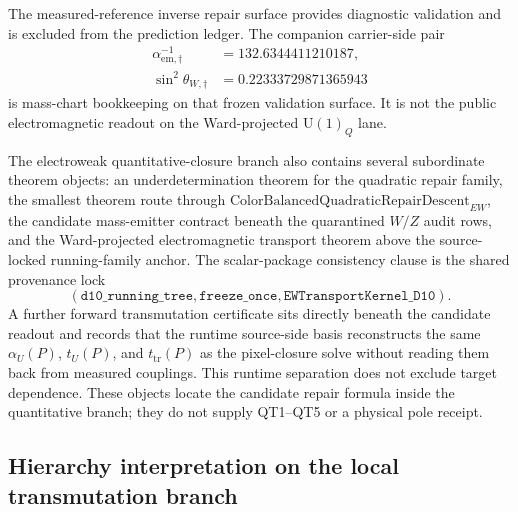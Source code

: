 \documentclass[11pt]{article}
\newcommand{\U}{\mathrm{U}}
\begin{document}
The measured-reference inverse repair surface provides diagnostic validation and is excluded from
the prediction ledger.
The companion carrier-side pair
\[
\begin{aligned}
\alpha_{\mathrm{em},\dagger}^{-1}&=132.6344411210187,\\
\sin^2\theta_{W,\dagger}&=0.22333729871365943
\end{aligned}
\]
is mass-chart bookkeeping on that frozen validation surface. It is not the public electromagnetic
readout on the Ward-projected \(\U(1)_Q\) lane.

The electroweak quantitative-closure branch also contains several subordinate theorem objects: an
underdetermination theorem for the quadratic repair family, the smallest theorem route
through \(\mathrm{ColorBalancedQuadraticRepairDescent}_{EW}\), the candidate mass-emitter
contract beneath the quarantined \(W/Z\) audit rows, and the Ward-projected electromagnetic transport theorem above
the source-locked running-family anchor. The scalar-package consistency clause is the shared
provenance lock
\[
(\texttt{d10\_running\_tree},\texttt{freeze\_once},\texttt{EWTransportKernel\_D10}).
\]
A further forward transmutation certificate sits directly beneath the candidate readout and
records that the runtime source-side basis reconstructs the same \(\alpha_U(P)\), \(t_U(P)\), and
\(t_{\mathrm{tr}}(P)\) as the pixel-closure solve without reading them back from measured
couplings. This runtime separation does not exclude target dependence. These objects locate the
candidate repair formula inside the quantitative branch; they do not supply QT1--QT5 or a
physical pole receipt.

\subsection{Hierarchy interpretation on the local transmutation branch}
\end{document}
